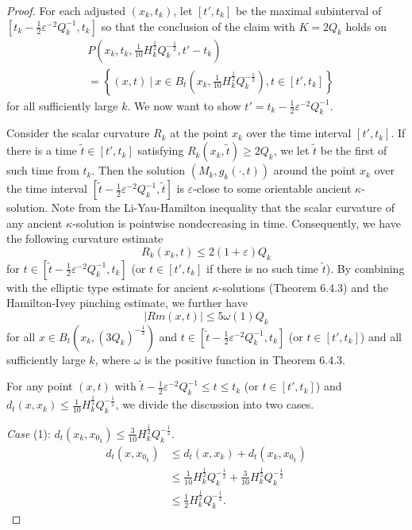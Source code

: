 \begin{proof}
For each adjusted $(x_k,t_k)$, let $[t',t_k]$ be the maximal
subinterval of $[t_k-\frac{1}{2}\varepsilon^{-2}Q_k^{-1},t_k]$ so
that the conclusion of the claim with $K=2Q_k$ holds on
\begin{align*}
& P\left(x_k,t_k,\frac{1}{10}H_k^{\frac{1}{2}}Q_k^{-\frac{1}{2}},t'-t_k\right)\\
&=\left\{ ({x},{t}) \ |\ {x} \in
B_{{t}}\left(x_k,\frac{1}{10}H_k^{\frac{1}{2}}Q_k^{-\frac{1}{2}}\right),
{t} \in [t',t_k]\right\}
\end{align*}
for all sufficiently large $k$. We now want to show $t' =
t_k-\frac{1}{2}\varepsilon^{-2}Q_k^{-1}$.

Consider the scalar curvature $R_k$ at the point $x_k$ over the
time interval $[t',t_k]$. If there is a time $\tilde{t} \in
[t',t_k]$ satisfying $R_k(x_k,\tilde{t}) \geq 2Q_k$, we let
$\tilde{t}$ be the first of such time from $t_k$. Then the
solution $(M_k,g_k(\cdot,t))$ around the point $x_k$ over the time
interval $[\tilde{t}-
\frac{1}{2}\varepsilon^{-2}Q_k^{-1},{\tilde{t}}]$ is
$\varepsilon$-close to some orientable ancient $\kappa$-solution.
Note from the Li-Yau-Hamilton inequality that the scalar curvature
of any ancient $\kappa$-solution is pointwise nondecreasing in
time. Consequently, we have the following curvature estimate
$$
R_k(x_k,t) \leq 2(1+\varepsilon)Q_k
$$
for $ t \in [\tilde{t}- \frac{1}{2}\varepsilon^{-2}Q_k^{-1},t_k]$
(or $t \in [t',t_k]$ if there is no such time $\tilde{t}$).  By
combining with the elliptic type estimate for ancient
$\kappa$-solutions (Theorem 6.4.3) and the Hamilton-Ivey pinching
estimate, we further have \begin{equation}
|Rm(x,t)| \leq 5\omega(1)Q_k  %
\end{equation} for all $x \in B_t(x_k,(3Q_k)^{-\frac{1}{2}})$ and $t \in
[\tilde{t}- \frac{1}{2}\varepsilon^{-2}Q_k^{-1},t_k]$ (or $t \in
[t',t_k]$) and all sufficiently large $k$, where $\omega$ is the
positive function in Theorem 6.4.3.

For any point $(x,t)$ with $ \tilde{t}-
\frac{1}{2}\varepsilon^{-2}Q_k^{-1} \leq t \leq t_k$ (or $t \in
[t',t_k]$) and $d_t(x,x_k) \leq
\frac{1}{10}H_k^{\frac{1}{2}}Q_k^{-\frac{1}{2}}$, we divide the
discussion into two cases.

\medskip
{\it Case} (1): $d_t(x_k,x_{0_k}) \leq
\frac{3}{10}H_k^{\frac{1}{2}}Q_k^{-\frac{1}{2}}.$
\begin{align}
d_t(x,x_{0_k})&  \leq
d_t(x,x_k) + d_t(x_k,x_{0_k})\\
&  \leq\frac{1}{10}H_k^{\frac{1}{2}}Q_k^{-\frac{1}{2}}
+ \frac{3}{10}H_k^{\frac{1}{2}}Q_k^{-\frac{1}{2}}\nonumber\\
&  \leq \frac{1}{2}H_k^{\frac{1}{2}}Q_k^{-\frac{1}{2}}.\nonumber
\end{align} %


\end{proof}
